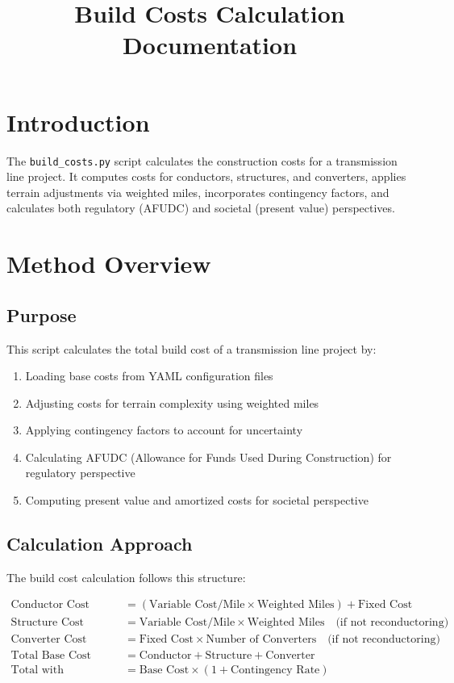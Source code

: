 \documentclass[12pt]{article}
\title{Build Costs Calculation Documentation}
\author{}
\date{}
\begin{document}
\maketitle

\section{Introduction}

The \texttt{build\_costs.py} script calculates the construction costs for a transmission line project. It computes costs for conductors, structures, and converters, applies terrain adjustments via weighted miles, incorporates contingency factors, and calculates both regulatory (AFUDC) and societal (present value) perspectives.

\section{Method Overview}

\subsection{Purpose}

This script calculates the total build cost of a transmission line project by:
\begin{enumerate}
    \item Loading base costs from YAML configuration files
    \item Adjusting costs for terrain complexity using weighted miles
    \item Applying contingency factors to account for uncertainty
    \item Calculating AFUDC (Allowance for Funds Used During Construction) for regulatory perspective
    \item Computing present value and amortized costs for societal perspective
\end{enumerate}

\subsection{Calculation Approach}

The build cost calculation follows this structure:

\begin{align}
\text{Conductor Cost} &= (\text{Variable Cost/Mile} \times \text{Weighted Miles}) + \text{Fixed Cost} \\
\text{Structure Cost} &= \text{Variable Cost/Mile} \times \text{Weighted Miles} \quad \text{(if not reconductoring)} \\
\text{Converter Cost} &= \text{Fixed Cost} \times \text{Number of Converters} \quad \text{(if not reconductoring)} \\
\text{Total Base Cost} &= \text{Conductor} + \text{Structure} + \text{Converter} \\
\text{Total with Contingencies} &= \text{Base Cost} \times (1 + \text{Contingency Rate})
\end{align}
\end{document}
